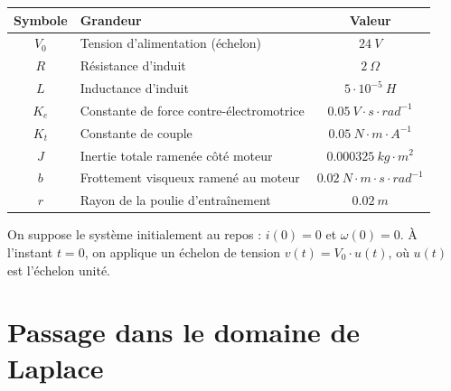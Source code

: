 \begin{center}
\begin{tabular}{|c|l|c|}
\hline
\textbf{Symbole} & \textbf{Grandeur} & \textbf{Valeur} \\
\hline
$V_0$ & Tension d'alimentation (échelon) & $24\ V$ \\
$R$ & Résistance d'induit & $2\ \Omega$ \\
$L$ & Inductance d'induit & $5\cdot 10^{-5}\ H$ \\
$K_e$ & Constante de force contre-électromotrice & $0.05\ V\cdot s\cdot rad^{-1}$ \\
$K_t$ & Constante de couple & $0.05\ N\cdot m\cdot A^{-1}$ \\
$J$ & Inertie totale ramenée côté moteur & $0.000325\ kg\cdot m^2$ \\
$b$ & Frottement visqueux ramené au moteur & $0.02\ N\cdot m \cdot s\cdot rad^{-1}$ \\
$r$ & Rayon de la poulie d'entraînement & $0.02\ m$ \\
\hline
\end{tabular}
\end{center}

On suppose le système initialement au repos : $i(0) = 0$ et $\omega(0) = 0$. À l'instant $t=0$, on applique un échelon de tension $v(t) = V_0\cdot u(t)$, où $u(t)$ est l'échelon unité.

\section{Passage dans le domaine de Laplace}


\vspace{0.5cm}


\vspace{0.5cm}


\vspace{0.5cm}

